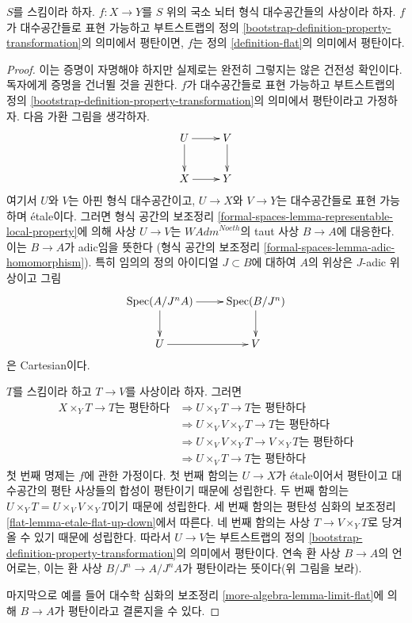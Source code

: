 \begin{lemma}
\label{lemma-representable-flat}
$S$를 스킴이라 하자.
$f : X \to Y$를 $S$ 위의 국소 뇌터 형식 대수공간들의 사상이라 하자.
$f$가 대수공간들로 표현 가능하고 부트스트랩의 정의
\ref{bootstrap-definition-property-transformation}의 의미에서 평탄이면,
$f$는 정의 \ref{definition-flat}의 의미에서 평탄이다.
\end{lemma}

\begin{proof}
이는 증명이 자명해야 하지만 실제로는 완전히 그렇지는 않은 건전성 확인이다.
독자에게 증명을 건너뛸 것을 권한다.
$f$가 대수공간들로 표현 가능하고 부트스트랩의 정의
\ref{bootstrap-definition-property-transformation}의 의미에서 평탄이라고 가정하자.
다음 가환 그림을 생각하자.
$$
\xymatrix{
U \ar[d] \ar[r] & V \ar[d] \\
X \ar[r] & Y
}
$$
여기서 $U$와 $V$는 아핀 형식 대수공간이고, $U \to X$와 $V \to Y$는
대수공간들로 표현 가능하며 \'etale이다.
그러면 형식 공간의 보조정리
\ref{formal-spaces-lemma-representable-local-property}에 의해
사상 $U \to V$는 $\textit{WAdm}^{Noeth}$의 taut 사상
$B \to A$에 대응한다. 이는 $B \to A$가 adic임을 뜻한다
(형식 공간의 보조정리 \ref{formal-spaces-lemma-adic-homomorphism}).
특히 임의의 정의 아이디얼 $J \subset B$에 대하여 $A$의 위상은
$J$-adic 위상이고 그림
$$
\xymatrix{
\Spec(A/J^nA) \ar[r] \ar[d] & \Spec(B/J^n) \ar[d] \\
U \ar[r] & V
}
$$
은 Cartesian이다.

\medskip\noindent
$T$를 스킴이라 하고 $T \to V$를 사상이라 하자. 그러면
\begin{align*}
X \times_Y T \to T\text{는 평탄하다}
& \Rightarrow
U \times_Y T \to T\text{는 평탄하다} \\
& \Rightarrow
U \times_V V \times_Y T \to T\text{는 평탄하다} \\
& \Rightarrow
U \times_V V \times_Y T \to V \times_Y T\text{는 평탄하다} \\
& \Rightarrow
U \times_V T \to T\text{는 평탄하다}
\end{align*}
첫 번째 명제는 $f$에 관한 가정이다.
첫 번째 함의는 $U \to X$가 \'etale이어서 평탄이고
대수공간의 평탄 사상들의 합성이 평탄이기 때문에 성립한다.
두 번째 함의는 $U \times_Y T = U \times_V V \times_Y T$이기 때문에 성립한다.
세 번째 함의는 평탄성 심화의 보조정리
\ref{flat-lemma-etale-flat-up-down}에서 따른다.
네 번째 함의는 사상 $T \to V \times_Y T$로 당겨올 수 있기 때문에 성립한다.
따라서 $U \to V$는 부트스트랩의 정의
\ref{bootstrap-definition-property-transformation}의 의미에서 평탄이다.
연속 환 사상 $B \to A$의 언어로는, 이는 환 사상
$B/J^n \to A/J^nA$가 평탄이라는 뜻이다(위 그림을 보라).

\medskip\noindent
마지막으로 예를 들어 대수학 심화의 보조정리
\ref{more-algebra-lemma-limit-flat}에 의해 $B \to A$가 평탄이라고 결론지을 수 있다.
\end{proof}


